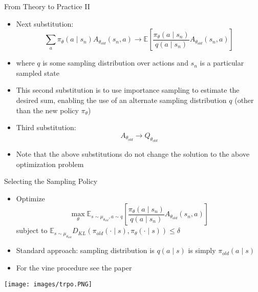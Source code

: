 \documentclass[aspectratio=169]{../latex_main/tntbeamer}  %
\begin{document}
\begin{frame}[c]{From Theory to Practice II}
	
    \begin{itemize}
        \item Next substitution:
        $$\sum_{a} \pi_\theta (a\mid s_n) A_{\theta_{old}} (s_n, a) \to \mathbb{E}\left[ \frac{\pi_\theta(a \mid s_n)}{q(a\mid s_n)} A_{\theta_{old}} (s_n, a) \right] $$
        \item where $q$ is some sampling distribution over actions and $s_n$ is a particular sampled state
        \item This second substitution is to use importance sampling to estimate the desired sum, enabling the use of an alternate sampling distribution $q$ (other than the new policy $\pi_\theta$)
        \pause
        \item Third substitution:
        $$ A_{\theta_{old}} \to Q_{\theta_{old}}$$
        \item Note that the above substitutions do not change the solution to the above optimization problem
    \end{itemize}

\end{frame}
\begin{frame}[c]{Selecting the Sampling Policy}
	
    \begin{itemize}
        \item Optimize
        $$ \max_\theta \mathbb{E}_{s\sim \mu_{\theta_{old}}, a \sim q} \left[ \frac{\pi_\theta(a \mid s_n)}{q(a\mid s_n)} A_{\theta_{old}} (s_n, a) \right]$$
        {\centering subject to $\mathbb{E}_{s\sim \mu_{\theta_{old}}} D_{KL}(\pi_{old}(\cdot \mid s), \pi_\theta (\cdot \mid s)) \leq \delta$ \\}
        \item Standard approach: sampling distribution is $q(a\mid s)$ is simply $\pi_{old}(a \mid s)$
        \item For the vine procedure see the paper
    \end{itemize}
    
    \centering
    \texttt{[image: images/trpo.PNG]}\\

\end{frame}
\end{document}
